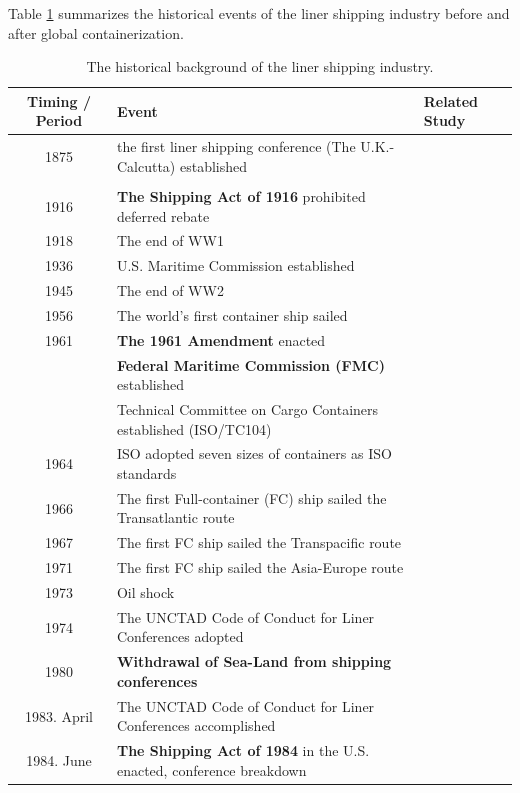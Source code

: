 \documentclass[11pt]{article}
\begin{document}
Table \ref{tb:industry_history} summarizes the historical events of the liner shipping industry before and after global containerization.
\begin{table}[ht!]
    \caption{The historical background of the liner shipping industry.}
    \label{tb:industry_history}
    \centering\scriptsize{}
    \begin{tabular}{cll}
      Timing / Period & Event & Related Study\\\hline
      1875 & the first liner shipping conference (The U.K.-Calcutta) established & \cite{morton1997entry}\\
       &  & \cite{podolny1999social}\\
      1916 & \textbf{The Shipping Act of 1916} prohibited deferred rebate &\\
      1918 & The end of WW1 & \cite{deltas1999american}\\
      1936 & U.S. Maritime Commission established &\\
      1945 & The end of WW2 & \\
      1956 & The world's first container ship sailed & \\
      1961 & \textbf{The 1961 Amendment} enacted & \\
      & \textbf{Federal Maritime Commission (FMC)} established & \\
      & Technical Committee on Cargo Containers established (ISO/TC104) &\\
      1964 & ISO adopted seven sizes of containers as ISO standards &\\
      \hline
      1966 & The first Full-container (FC) ship sailed the Transatlantic route &\\
      1967 & The first FC ship sailed the Transpacific route &\\
      1971 & The first FC ship sailed the Asia-Europe route& \\
      1973 & Oil shock &\\
      1974 & The UNCTAD Code of Conduct for Liner Conferences adopted &\cite{fox1992empirical,fox1995some}\\
      1980 & \textbf{Withdrawal of Sea-Land from shipping conferences}&\cite{sjostrom1989collusion}\\
      1983. April&The UNCTAD Code of Conduct for Liner Conferences accomplished &\\
      1984. June & \textbf{The Shipping Act of 1984} in the U.S. enacted, conference breakdown &\cite{clyde1995effectiveness,clyde1998market}\\

\end{tabular}
\end{table}
\end{document}
